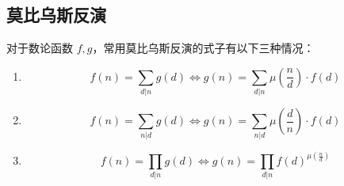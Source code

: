 \subsection{莫比乌斯反演}

对于数论函数 $f,g$，常用莫比乌斯反演的式子有以下三种情况：

\begin{enumerate}
    \item $$f(n)=\sum_{d|n} g(d) \iff g(n) = \sum_{d|n} \mu(\frac{n}{d})\cdot f(d)$$
    \item $$f(n)=\sum_{n|d} g(d) \iff g(n) = \sum_{n|d} \mu(\frac{d}{n})\cdot f(d)$$
    \item $$f(n)=\prod_{d|n}g(d) \iff g(n) = \prod_{d|n} f(d)^{\mu(\frac{n}{d})}$$
\end{enumerate}